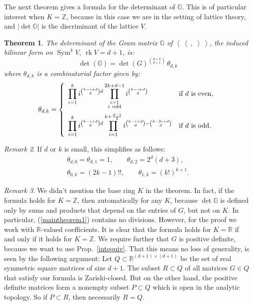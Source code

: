 \documentclass{amsart}
\DeclareMathOperator{\rank}{rk}
\DeclareMathOperator{\Sym}{Sym}
\newcommand{\bra}{\left<\!\!\!\:\left<}
\newcommand{\ket}{\right>\!\!\!\:\right>}
\newcommand{\G}{\mathbb{G}}
\newcommand{\R}{\mathbb{R}}
\newcommand{\Z}{\mathbb{Z}}
\theoremstyle{plain}
\newtheorem{theorem}{Theorem}[section]
\theoremstyle{definition}
\theoremstyle{remark}
\newtheorem{remark}[theorem]{Remark}
\begin{document}
The next theorem gives a formula for the determinant of $\G$. This is of particular interest when $K=\Z$, because in this case we are in the setting of lattice theory, and $|\det \G|$ is the discriminant of the lattice $V$.
\begin{theorem} \label{maintheorem}
The determinant of the Gram matrix $\G$ of $\bra\ ,\;\ket$, the induced bilinear form on $\Sym^kV,\ \rank V = d\!+\!1$, is:
\begin{equation}\label{maintheorem1}
\det(\G)= \det(G)^{\binom{d+k}{d+1}}\,\theta_{d,k}
\end{equation}
where $\theta_{d,k}$ is a combinatorial factor given by:
\begin{equation} \label{thetaDef}
\theta_{d,k} = \left\{
 \begin{array}{*2{l}p{5cm}}
 \displaystyle\prod_{i=1}^k i^{\binom{k-i+d}{d}d}\prod_{\substack{i=1 \\ i\ \text{odd}\\\ }}^{2k+d-1}i^{\binom{k-i+d}{d}} &\text{if }d\text{ is even}, \\
 \displaystyle\prod_{i=1}^k i^{\binom{k-i+d}{d}d}\prod_{i=1}^{k+\frac{d-1}{2}} i^{\binom{k-i+d}{d} - \binom{k-2i+d}{d}} &\text{if }d\text{ is odd}.
\end{array}
\right.
\end{equation}
\end{theorem}
\begin{remark} If $d$ or $k$ is small, this simplifies as follows:
\begin{gather*}
\theta_{d,0}=\theta_{d,1} =1,\qquad \theta_{d,2} = 2^{d}(d+3), \\
\theta_{0,k} = (2k-1)!!, \qquad \theta_{1,k} = (k!)^{k+1}.
\end{gather*}
\end{remark}
\begin{remark}
We didn't mention the base ring $K$ in the theorem. In fact, if the formula holds for $K=\Z$, then automatically for any $K$, because $\det\G$ is defined only by sums and products that depend on the entries of $G$, but not on $K$. In particular, (\ref{maintheorem1}) contains no divisions. However, for the proof we work with $\R$-valued coefficients. It is clear that the formula holds for $K=\R$ if and only if it holds for $K=\Z$. We require further that $G$ is positive definite, because we want to use Prop.~\ref{intequiv}. That this means no loss of generality, is seen by the following argument: Let $Q\subset \R^{(d+1)\times(d+1)}$ be the set of real symmetric square matrices of size $d+1$. The subset $R\subset Q$ of all matrices $G\in Q$ that satisfy our formula is Zariski-closed. But on the other hand, the positive definite matrices form a nonempty subset $P\subset Q$ which is open in the analytic topology. So if $P\subset R$, then necessarily $R=Q$.
\end{remark}
\end{document}
